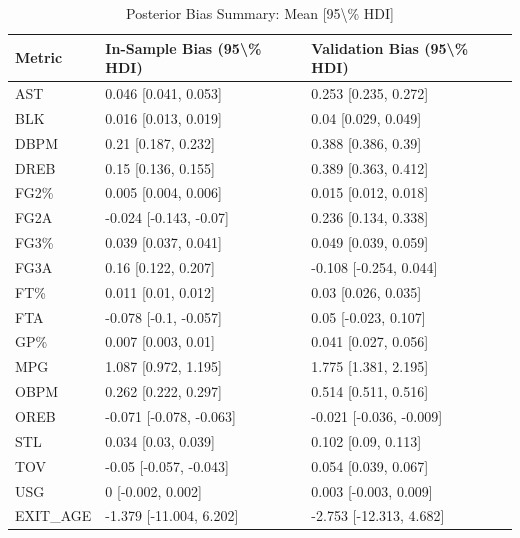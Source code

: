 \begin{table}[t]
\caption*{
{\fontsize{20}{25}\selectfont  Posterior Bias Summary: Mean [95\textbackslash{}\% HDI]\fontsize{12}{15}\selectfont }
} 
\fontsize{12.0pt}{14.0pt}\selectfont
\begin{tabular*}{\linewidth}{@{\extracolsep{\fill}}lll}
\toprule
Metric & In-Sample Bias (95\textbackslash{}\% HDI) & Validation Bias (95\textbackslash{}\% HDI) \\ 
\midrule\addlinespace[2.5pt]
AST & 0.046 [0.041, 0.053] & 0.253 [0.235, 0.272] \\ 
BLK & 0.016 [0.013, 0.019] & 0.04 [0.029, 0.049] \\ 
DBPM & 0.21 [0.187, 0.232] & 0.388 [0.386, 0.39] \\ 
DREB & 0.15 [0.136, 0.155] & 0.389 [0.363, 0.412] \\ 
FG2\% & 0.005 [0.004, 0.006] & 0.015 [0.012, 0.018] \\ 
FG2A & -0.024 [-0.143, -0.07] & 0.236 [0.134, 0.338] \\ 
FG3\% & 0.039 [0.037, 0.041] & 0.049 [0.039, 0.059] \\ 
FG3A & 0.16 [0.122, 0.207] & -0.108 [-0.254, 0.044] \\ 
FT\% & 0.011 [0.01, 0.012] & 0.03 [0.026, 0.035] \\ 
FTA & -0.078 [-0.1, -0.057] & 0.05 [-0.023, 0.107] \\ 
GP\% & 0.007 [0.003, 0.01] & 0.041 [0.027, 0.056] \\ 
MPG & 1.087 [0.972, 1.195] & 1.775 [1.381, 2.195] \\ 
OBPM & 0.262 [0.222, 0.297] & 0.514 [0.511, 0.516] \\ 
OREB & -0.071 [-0.078, -0.063] & -0.021 [-0.036, -0.009] \\ 
STL & 0.034 [0.03, 0.039] & 0.102 [0.09, 0.113] \\ 
TOV & -0.05 [-0.057, -0.043] & 0.054 [0.039, 0.067] \\ 
USG & 0 [-0.002, 0.002] & 0.003 [-0.003, 0.009] \\ 
EXIT\_AGE & -1.379 [-11.004, 6.202] & -2.753 [-12.313, 4.682] \\ 
\bottomrule
\end{tabular*}
\end{table}


